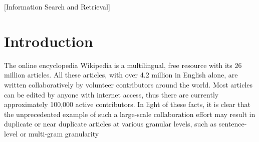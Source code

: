 \documentclass{acm_proc_article-sp}
\begin{document}
\maketitle
\begin{abstract}
The growth of Internet has enabled collaboration and cooperation on a large scale, resulting in an abundant number of near-duplicate web documents. The range of near-duplicate occurrences is even more evident within Wikipedia articles, due to its editing largely being open to the online community. Except for particularly sensitive and/or vandalism-prone pages that are "protected" to some degree from editing, the reader of an article can edit the text by copying from another article without prior approval. There is no current automated mechanism for truth validation. Although we are not inspired to measure the quality of Wikipedia articles, we are interested in finding near-duplicate occurrences at various granularity levels. 

In this paper, we describe a novel similarity detection algorithm that utilizes a locality sensitive hashing (LSH) technique on the MapReduce framework. The algorithm has been designed and implemented to detect similar articles using large Wikipedia dumps, in compressed or uncompressed forms. Experimental results appear to support that our method is able to efficiently and effectively detect similar articles across Wikipedia.
\end{abstract}

[Information Search and Retrieval]


\section{Introduction}
The online encyclopedia Wikipedia is a multilingual, free resource with its 26 million articles. All these articles, with over 4.2 million in English alone, are written collaboratively by volunteer contributors around the world. Most articles can be edited by anyone with internet access, thus there are currently approximately 100,000 active contributors. In light of these facts, it is clear that the unprecedented example of such a large-scale collaboration effort may result in duplicate or near duplicate articles at various granular levels, such as sentence-level or multi-gram granularity \cite{wiki:weblink}
\end{document}
